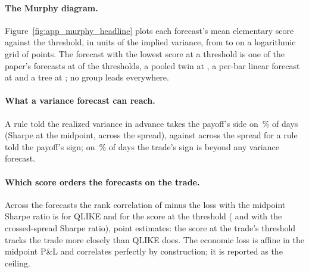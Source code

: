 \paragraph{The Murphy diagram.} Figure~\ref{fig:app_murphy_headline} plots each forecast's mean
elementary score against the threshold, in units of the implied variance, from \hmurGridMin{}
to \hmurGridMax{} on a logarithmic grid of \hmurNGrid{} points. The forecast with the lowest
score at a threshold is one of the paper's forecasts at \hmurNLeadPaper{} of the
\hmurNGrid{} thresholds, a pooled twin at \hmurNLeadPooled, a per-bar linear forecast at
\hmurNLeadPerbarLinear{} and a tree at \hmurNLeadTrees; no group leads everywhere.

\paragraph{What a variance forecast can reach.} A rule told the realized variance in advance
takes the payoff's side on \hmurOracleAgree\,\% of days (Sharpe \hmurOracleShMid{} at the
midpoint, \hmurOracleShX{} across the spread), against \hmurPayoffOracleShX{} across the spread
for a rule told the payoff's sign; on \hmurOracleMiss\,\% of days the trade's sign is beyond
any variance forecast.

\paragraph{Which score orders the forecasts on the trade.} Across the \hmurNSet{} forecasts
the rank correlation of minus the loss with the midpoint Sharpe ratio is \hmurRhoQMid{} for
QLIKE and \hmurRhoESMid{} for the score at the threshold (\hmurRhoQX{} and \hmurRhoESX{} with
the crossed-spread Sharpe ratio), point estimates: the score at the trade's threshold tracks
the trade more closely than QLIKE does. The economic loss is affine in the midpoint P\&L and
correlates perfectly by construction; it is reported as the ceiling.


